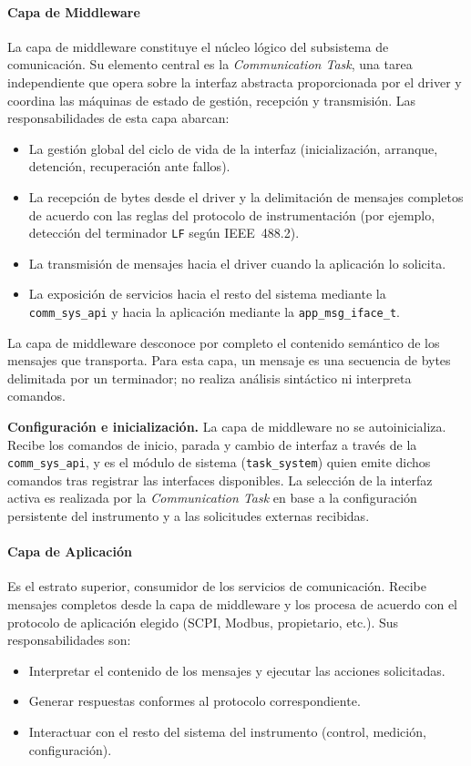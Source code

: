 \paragraph{Capa de Middleware}

La capa de middleware constituye el núcleo lógico del subsistema de comunicación. Su elemento central es la \textit{Communication Task}, una tarea independiente que opera sobre la interfaz abstracta proporcionada por el driver y coordina las máquinas de estado de gestión, recepción y transmisión. Las responsabilidades de esta capa abarcan:
\begin{itemize}
    \item La gestión global del ciclo de vida de la interfaz (inicialización, arranque, detención, recuperación ante fallos).
    \item La recepción de bytes desde el driver y la delimitación de mensajes completos de acuerdo con las reglas del protocolo de instrumentación (por ejemplo, detección del terminador \texttt{LF} según IEEE~488.2).
    \item La transmisión de mensajes hacia el driver cuando la aplicación lo solicita.
    \item La exposición de servicios hacia el resto del sistema mediante la \texttt{comm\_sys\_api} y hacia la aplicación mediante la \texttt{app\_msg\_iface\_t}.
\end{itemize}

La capa de middleware desconoce por completo el contenido semántico de los mensajes que transporta. Para esta capa, un mensaje es una secuencia de bytes delimitada por un terminador; no realiza análisis sintáctico ni interpreta comandos.

\textbf{Configuración e inicialización.} La capa de middleware no se autoinicializa. Recibe los comandos de inicio, parada y cambio de interfaz a través de la \texttt{comm\_sys\_api}, y es el módulo de sistema (\texttt{task\_system}) quien emite dichos comandos tras registrar las interfaces disponibles. La selección de la interfaz activa es realizada por la \textit{Communication Task} en base a la configuración persistente del instrumento y a las solicitudes externas recibidas.

\paragraph{Capa de Aplicación}

Es el estrato superior, consumidor de los servicios de comunicación. Recibe mensajes completos desde la capa de middleware y los procesa de acuerdo con el protocolo de aplicación elegido (SCPI, Modbus, propietario, etc.). Sus responsabilidades son:
\begin{itemize}
    \item Interpretar el contenido de los mensajes y ejecutar las acciones solicitadas.
    \item Generar respuestas conformes al protocolo correspondiente.
    \item Interactuar con el resto del sistema del instrumento (control, medición, configuración).
\end{itemize}

